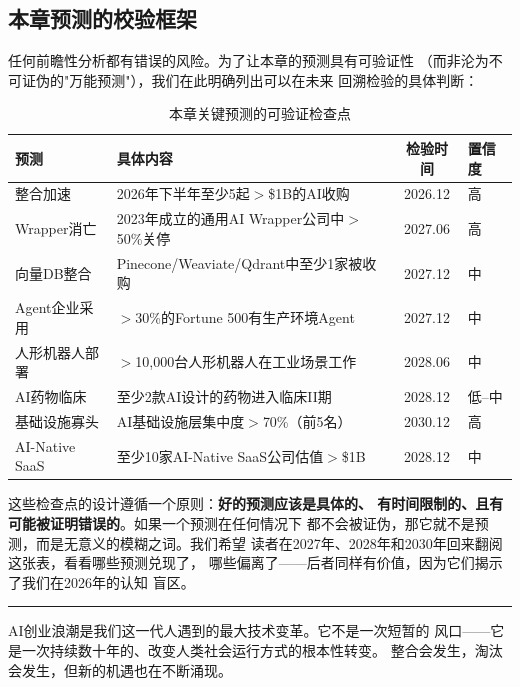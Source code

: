 \subsection{本章预测的校验框架}
\label{subsec:outlook-validation-framework}

任何前瞻性分析都有错误的风险。为了让本章的预测具有可验证性
（而非沦为不可证伪的"万能预测"），我们在此明确列出可以在未来
回溯检验的具体判断：

\begin{table}[htbp]
\centering
\caption{本章关键预测的可验证检查点}
\label{tab:prediction-checkpoints}
\small
\begin{tabularx}{\textwidth}{lXcl}
\toprule
\rowcolor{figLightGray}
\textbf{预测} & \textbf{具体内容} & \textbf{检验时间} & \textbf{置信度} \\
\midrule
整合加速 & 2026年下半年至少5起$>$\$1B的AI收购 & 2026.12 & 高 \\
Wrapper消亡 & 2023年成立的通用AI Wrapper公司中$>$50\%关停 & 2027.06 & 高 \\
向量DB整合 & Pinecone/Weaviate/Qdrant中至少1家被收购 & 2027.12 & 中 \\
Agent企业采用 & $>$30\%的Fortune 500有生产环境Agent & 2027.12 & 中 \\
人形机器人部署 & $>$10,000台人形机器人在工业场景工作 & 2028.06 & 中 \\
AI药物临床 & 至少2款AI设计的药物进入临床II期 & 2028.12 & 低--中 \\
基础设施寡头 & AI基础设施层集中度$>$70\%（前5名） & 2030.12 & 高 \\
AI-Native SaaS & 至少10家AI-Native SaaS公司估值$>$\$1B & 2028.12 & 中 \\
\bottomrule
\end{tabularx}
\end{table}

这些检查点的设计遵循一个原则：\textbf{好的预测应该是具体的、
有时间限制的、且有可能被证明错误的}。如果一个预测在任何情况下
都不会被证伪，那它就不是预测，而是无意义的模糊之词。我们希望
读者在2027年、2028年和2030年回来翻阅这张表，看看哪些预测兑现了，
哪些偏离了——后者同样有价值，因为它们揭示了我们在2026年的认知
盲区。

\bigskip

\begin{center}
\rule{0.5\textwidth}{0.4pt}
\end{center}

\bigskip

AI创业浪潮是我们这一代人遇到的最大技术变革。它不是一次短暂的
风口——它是一次持续数十年的、改变人类社会运行方式的根本性转变。
整合会发生，淘汰会发生，但新的机遇也在不断涌现。

